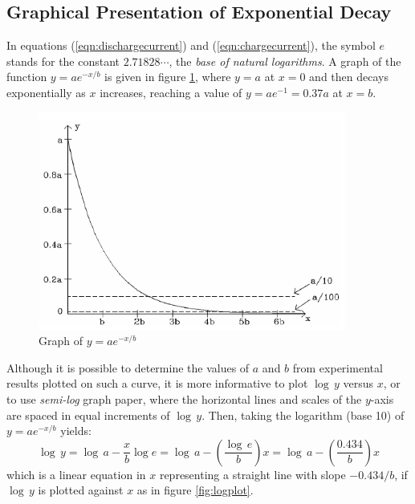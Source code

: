 \subsection{Graphical Presentation of Exponential Decay}

In equations (\ref{eqn:dischargecurrent}) and (\ref{eqn:chargecurrent}), the symbol $e$ stands for the constant $2.71828\cdots$, the \emph{base of natural logarithms}. A graph of the function $y = ae^{-x/b}$ is given in figure \ref{fig:expgraph}, where $y=a$ at $x=0$ and then decays exponentially as $x$ increases, reaching a value of $y = ae^{-1} = 0.37a$ at $x=b$.

\begin{figure}[h]
    \begin{center}
        \includegraphics[width=0.9\textwidth]{./Exp4/pic/image4.png}
    \end{center}
    \caption{Graph of $y=ae^{-x/b}$}
    \label{fig:expgraph}
\end{figure}

Although it is possible to determine the values of $a$ and $b$ from experimental results plotted on such a curve, it is more informative to plot $\log\,y$ versus $x$, or to use \emph{semi-log} graph paper, where the horizontal lines and scales of the $y$-axis are spaced in equal increments of $\log\,y$. Then, taking the logarithm (base 10) of $y=ae^{-x/b}$ yields:
\begin{equation}
    \log\,y = \log\,a - \frac{x}{b}\log e = \log\,a - \left( \frac{\log\,e}{b} \right)x = \log\,a - \left( \frac{0.434}{b} \right)x
    \label{eqn:logslope}
\end{equation}
which is a linear equation in $x$ representing a straight line with slope $-0.434/b$, if $\log\,y$ is plotted against $x$ as in figure \ref{fig:logplot}. \myskip

